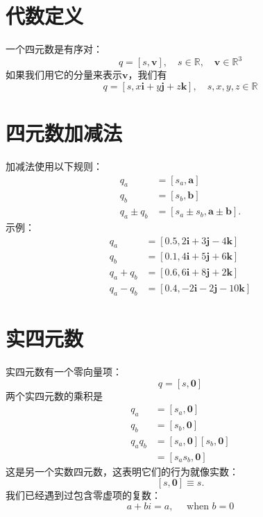\section{代数定义}
一个四元数是有序对：
$$
    q=[s, \mathbf{v}], \quad s \in \mathbb{R}, \quad \mathbf{v} \in \mathbb{R}^{3}
$$
如果我们用它的分量来表示$\mathbf{v}$，我们有
$$
    q=[s, x \mathbf{i}+y \mathbf{j}+z \mathbf{k}], \quad s, x, y, z \in \mathbb{R}
$$

\section{四元数加减法}
加减法使用以下规则：
$$
    \begin{aligned}
        q_{a}           & =\left[s_{a}, \mathbf{a}\right]                            \\
        q_{b}           & =\left[s_{b}, \mathbf{b}\right]                            \\
        q_{a} \pm q_{b} & =\left[s_{a} \pm s_{b}, \mathbf{a} \pm \mathbf{b}\right] .
    \end{aligned}
$$
示例：
$$
    \begin{aligned}
        q_{a}       & =[0.5,2 \mathbf{i}+3 \mathbf{j}-4 \mathbf{k}]   \\
        q_{b}       & =[0.1,4 \mathbf{i}+5 \mathbf{j}+6 \mathbf{k}]   \\
        q_{a}+q_{b} & =[0.6,6 \mathbf{i}+8 \mathbf{j}+2 \mathbf{k}]   \\
        q_{a}-q_{b} & =[0.4,-2 \mathbf{i}-2 \mathbf{j}-10 \mathbf{k}]
    \end{aligned}
$$

\section{实四元数}
实四元数有一个零向量项：
$$
    q=[s, \mathbf{0}]
$$
两个实四元数的乘积是
$$
    \begin{aligned}
        q_{a}       & =\left[s_{a}, \mathbf{0}\right]                               \\
        q_{b}       & =\left[s_{b}, \mathbf{0}\right]                               \\
        q_{a} q_{b} & =\left[s_{a}, \mathbf{0}\right]\left[s_{b}, \mathbf{0}\right] \\
                    & =\left[s_{a} s_{b}, \mathbf{0}\right]
    \end{aligned}
$$
这是另一个实数四元数，这表明它们的行为就像实数：
$$
    [s, \mathbf{0}] \equiv s.
$$
我们已经遇到过包含零虚项的复数：
$$
    a+b i=a, \quad \text { when } b=0
$$

